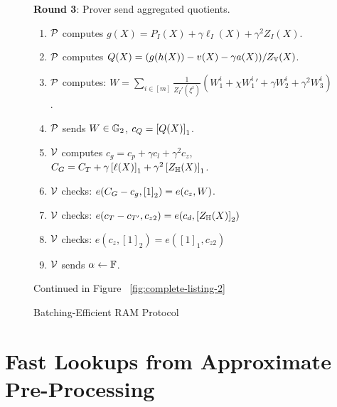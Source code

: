 \begin{figure}[t!]
\begin{mdframed}
        {\bf Round 3}: Prover send aggregated quotients.
        \begin{enumerate}[leftmargin=1em, label=\arabic*.]
            \item $\mathcal{P}$ computes $g(X)=P_I(X) + \gamma \ell_I(X) + \gamma^2 Z_I(X)$.
            \item $\mathcal{P}$ computes $Q(X) = (g(h(X)) - v(X) -\gamma a(X))/Z_{\mathbb{V}}(X)$.
            \item $\mathcal{P}$ computes: $W = \sum_{i\in [m]} \frac{1}{Z_I'(\xi^i)} (W_1^i + \chi {W_1^i}' + \gamma W_2^i + \gamma^2 W_3^i)$.
            \item $\mathcal{P}$ sends $W\in \mathbb{G}_2$, $c_Q=\left[{Q(X)}\right]_1$.
            \item $\mathcal{V}$ computes $c_g = c_p + \gamma c_l + \gamma^2 c_z$, $C_G = C_T + \gamma\left[{\ell(X)}\right]_1+\gamma^2\left[{Z_\mathbb{H}(X)}\right]_1$.
            \item $\mathcal{V}$ checks: $e(C_G - c_g, \left[{1}\right]_2)=e(c_z, W)$.
            \item $\mathcal{V}$ checks: $e(c_T-c_{T'}, c_{z2})=e(c_d, \left[{Z_\mathbb{H}(X)}\right]_2)$
            \item $\mathcal{V}$ checks: $e(c_z, [1]_2)=e([1]_1, c_{z2})$
            \item $\mathcal{V}$ sends $\alpha\gets \mathbb{F}$.
        \end{enumerate}

        Continued in Figure ~\ref{fig:complete-listing-2}
    \end{mdframed}
    \caption{Batching-Efficient RAM Protocol}
    \label{fig:complete-listing}
\end{figure}






\section{Fast Lookups from Approximate Pre-Processing}\label{sec:update-protocol}














